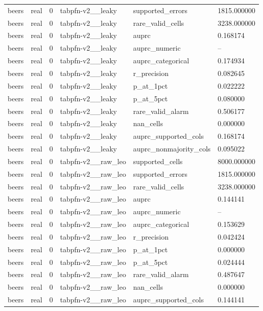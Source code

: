 \begin{tabular}{llllll}
beers & real & 0 & tabpfn-v2\_\_leaky & supported\_errors & 1815.000000 \\
beers & real & 0 & tabpfn-v2\_\_leaky & rare\_valid\_cells & 3238.000000 \\
beers & real & 0 & tabpfn-v2\_\_leaky & auprc & 0.168174 \\
beers & real & 0 & tabpfn-v2\_\_leaky & auprc\_numeric & -- \\
beers & real & 0 & tabpfn-v2\_\_leaky & auprc\_categorical & 0.174934 \\
beers & real & 0 & tabpfn-v2\_\_leaky & r\_precision & 0.082645 \\
beers & real & 0 & tabpfn-v2\_\_leaky & p\_at\_1pct & 0.022222 \\
beers & real & 0 & tabpfn-v2\_\_leaky & p\_at\_5pct & 0.080000 \\
beers & real & 0 & tabpfn-v2\_\_leaky & rare\_valid\_alarm & 0.506177 \\
beers & real & 0 & tabpfn-v2\_\_leaky & nan\_cells & 0.000000 \\
beers & real & 0 & tabpfn-v2\_\_leaky & auprc\_supported\_cols & 0.168174 \\
beers & real & 0 & tabpfn-v2\_\_leaky & auprc\_nonmajority\_cols & 0.095022 \\
beers & real & 0 & tabpfn-v2\_\_raw\_leo & supported\_cells & 8000.000000 \\
beers & real & 0 & tabpfn-v2\_\_raw\_leo & supported\_errors & 1815.000000 \\
beers & real & 0 & tabpfn-v2\_\_raw\_leo & rare\_valid\_cells & 3238.000000 \\
beers & real & 0 & tabpfn-v2\_\_raw\_leo & auprc & 0.144141 \\
beers & real & 0 & tabpfn-v2\_\_raw\_leo & auprc\_numeric & -- \\
beers & real & 0 & tabpfn-v2\_\_raw\_leo & auprc\_categorical & 0.153629 \\
beers & real & 0 & tabpfn-v2\_\_raw\_leo & r\_precision & 0.042424 \\
beers & real & 0 & tabpfn-v2\_\_raw\_leo & p\_at\_1pct & 0.000000 \\
beers & real & 0 & tabpfn-v2\_\_raw\_leo & p\_at\_5pct & 0.024444 \\
beers & real & 0 & tabpfn-v2\_\_raw\_leo & rare\_valid\_alarm & 0.487647 \\
beers & real & 0 & tabpfn-v2\_\_raw\_leo & nan\_cells & 0.000000 \\
beers & real & 0 & tabpfn-v2\_\_raw\_leo & auprc\_supported\_cols & 0.144141 \\

\end{tabular}
